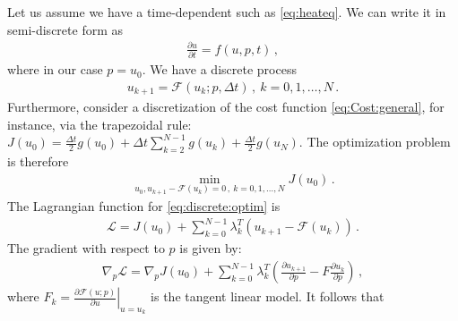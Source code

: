 \documentclass[10pt]{article}
\newcommand{\dt}{\Delta t}
\newcommand{\CostFcn}{J}
\newcommand{\param}{p}
\newcommand{\ModelN}{{\mathcal{F}}}
\newcommand{\ModelTLM}{F}
\newcommand{\Lagrangian}{{\mathcal{L}}}
\begin{document}
Let us assume we have a time-dependent such as \eqref{eq:heateq}. We
can write it in semi-discrete form as
%
\begin{align}
  \label{eq:semi:discrete:form}
\frac{\partial u}{\partial t} = f(u,p,t)\,, 
\end{align}
%
where in our case $\param=u_0$. We have a discrete process
%
\begin{align}
   \label{eq:discrete:form}
u_{k+1} = \ModelN(u_{k};\param,\dt)\,,~ k=0,1,\dots, N\,.
\end{align}
%
Furthermore, consider a discretization of the cost function
\eqref{eq:Cost:general}, for instance, via the trapezoidal rule:
$\CostFcn(u_0) = \frac{\dt}{2} g(u_0) + \dt\sum_{k=2}^{N-1}  g(u_k) +
\frac{\dt}{2} g(u_N)$. The optimization problem is therefore
%
\begin{align}
  \label{eq:discrete:optim}
\min_{u_0,u_{k+1} - \ModelN(u_{k})=0\,,~ k=0,1,\dots, N} \CostFcn(u_0)\,.
\end{align}
%
The Lagrangian function for \eqref{eq:discrete:optim} is
%
\begin{align}
  \nonumber
\Lagrangian = \CostFcn(u_0) + \sum_{k=0}^{N-1} \lambda_k^T
\left(u_{k+1} - \ModelN(u_{k})\right)\,. 
\end{align}
%
The gradient with respect to $\param$ is given by:
%
\begin{align}
  \nonumber
\nabla_\param\Lagrangian =\nabla_\param \CostFcn(u_0) + \sum_{k=0}^{N-1}
\lambda_k^T \left(\frac{\partial u_{k+1}}{\partial \param} - \ModelTLM
\frac{\partial u_{k}}{\partial \param}\right)\,,
\end{align}
%
where $\ModelTLM_k = \left. \frac{\partial \ModelN(u;\param)}{\partial
  u}\right|_{u=u_k}$ is the tangent linear model. It follows that
%
\end{document}
